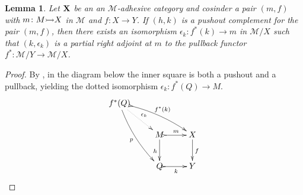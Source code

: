 \documentclass[a4paper]{article}
\newcommand{\mto}[0]{\scalebox{1}{$\rightarrowtail$}}
\def\X{\textbf {\textup{X}}}
\newtheorem{lemma}[theorem]{Lemma}
\theoremstyle{definition}
\begin{document}
\begin{lemma}\label{lem:part}
	Let $\X$ be an  an $\mathcal{M}$-adhesive category  and cosinder a pair $(m,f)$ with $m\colon M\mto X $ in $\mathcal{M}$ and $f:X\to Y$. If $(h, k)$ is a pushout complement for the pair $(m,f)$, then there exists an isomorphism $\epsilon_k:f^*(k)\to m$ in $\mathcal{M}/X$ such that $(k, \epsilon_k)$ is  a partial right adjoint at $m$ to the pullback functor $f^*\colon \mathcal{M}/Y\to \mathcal{M}/X$.
\end{lemma}
\begin{proof}
	By , in the diagram below the inner square is both  a pushout and a pullback, yielding the dotted isomorphism $\epsilon_k\colon f^*(Q)\to M$.
\[\xymatrix{f^*(Q) \ar@{.>}[dr]^{\epsilon_k} \ar@{>->}@/^.2cm/[drr]^{f^*(k)} \ar@/_.2cm/[ddr]_{p}\\& M \ar@{>->}[r]^{m}\ar[d]_{h}& X \ar[d]^f \\&Q\ar@{>->}[r]_{k}&Y}\]


\end{proof}
\end{document}
